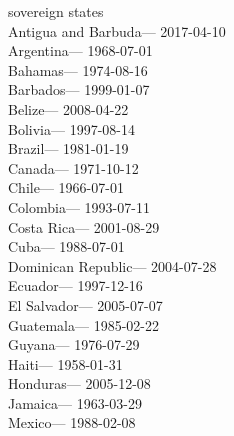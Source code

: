 sovereign states\\
\hspace*{0.333em}Antigua and Barbuda--- 2017-04-10\\
\hspace*{0.333em}Argentina--- 1968-07-01\\
\hspace*{0.333em}Bahamas--- 1974-08-16\\
\hspace*{0.333em}Barbados--- 1999-01-07\\
\hspace*{0.333em}Belize--- 2008-04-22\\
\hspace*{0.333em}Bolivia--- 1997-08-14\\
\hspace*{0.333em}Brazil--- 1981-01-19\\
\hspace*{0.333em}Canada--- 1971-10-12\\
\hspace*{0.333em}Chile--- 1966-07-01\\
\hspace*{0.333em}Colombia--- 1993-07-11\\
\hspace*{0.333em}Costa Rica--- 2001-08-29\\
\hspace*{0.333em}Cuba--- 1988-07-01\\
\hspace*{0.333em}Dominican Republic--- 2004-07-28\\
\hspace*{0.333em}Ecuador--- 1997-12-16\\
\hspace*{0.333em}El Salvador--- 2005-07-07\\
\hspace*{0.333em}Guatemala--- 1985-02-22\\
\hspace*{0.333em}Guyana--- 1976-07-29\\
\hspace*{0.333em}Haiti--- 1958-01-31\\
\hspace*{0.333em}Honduras--- 2005-12-08\\
\hspace*{0.333em}Jamaica--- 1963-03-29\\
\hspace*{0.333em}Mexico--- 1988-02-08\\
